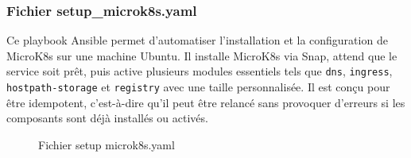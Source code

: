 \subsubsection{Fichier setup\_microk8s.yaml}
Ce playbook Ansible permet d'automatiser l'installation et la configuration de MicroK8s sur une machine Ubuntu. Il installe MicroK8s via Snap, attend que le service soit prêt, puis active plusieurs modules essentiels tels que \texttt{dns}, \texttt{ingress}, \texttt{hostpath-storage} et \texttt{registry} avec une taille personnalisée. Il est conçu pour être idempotent, c’est-à-dire qu’il peut être relancé sans provoquer d'erreurs si les composants sont déjà installés ou activés.
\begin{figure}[h]
    \begin{adjustwidth}{-3.5cm}{-3.5cm}
    \centering
    \caption{Fichier setup microk8s.yaml}
    \label{fig:ansible05}
    \end{adjustwidth}
\end{figure}
\newpage
